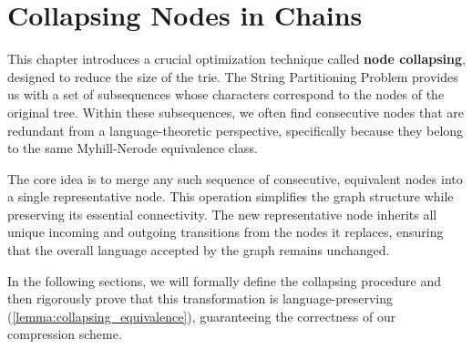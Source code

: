 \section{Collapsing Nodes in Chains} \label{sec:collapsing}
This chapter introduces a crucial optimization technique called \textbf{node collapsing}, designed to reduce the size of the trie. The String Partitioning Problem provides us with a set of subsequences whose characters correspond to the nodes of the original tree. Within these subsequences, we often find consecutive nodes that are redundant from a language-theoretic perspective, specifically because they belong to the same Myhill-Nerode equivalence class.

The core idea is to merge any such sequence of consecutive, equivalent nodes into a single representative node. This operation simplifies the graph structure while preserving its essential connectivity. The new representative node inherits all unique incoming and outgoing transitions from the nodes it replaces, ensuring that the overall language accepted by the graph remains unchanged.

In the following sections, we will formally define the collapsing procedure and then rigorously prove that this transformation is language-preserving (\cref{lemma:collapsing_equivalence}), guaranteeing the correctness of our compression scheme.

